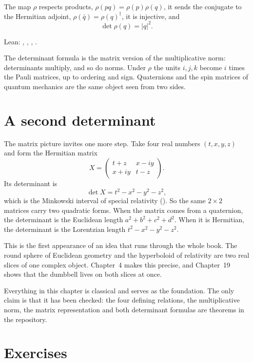 \begin{proposition}\proved\label{prop:rho}
The map $\rho$ respects products, $\rho(pq)=\rho(p)\rho(q)$, it sends the conjugate to the Hermitian adjoint, $\rho(\bar q)=\rho(q)^\dagger$, it is injective, and
\[
\det\rho(q)=|q|^2 .
\]
\end{proposition}
\noindent Lean: , , , .

The determinant formula is the matrix version of the multiplicative norm: determinants multiply, and so do norms. Under $\rho$ the units $i,j,k$ become $i$ times the Pauli matrices, up to ordering and sign. Quaternions and the spin matrices of quantum mechanics are the same object seen from two sides.

\section{A second determinant}

The matrix picture invites one more step. Take four real numbers $(t,x,y,z)$ and form the Hermitian matrix
\[
X=\begin{pmatrix} t+z & x-iy\\ x+iy & t-z\end{pmatrix}.
\]
Its determinant is
\[
\det X=t^2-x^2-y^2-z^2 ,
\]
which is the Minkowski interval of special relativity (). So the same $2\times2$ matrices carry two quadratic forms. When the matrix comes from a quaternion, the determinant is the Euclidean length $a^2+b^2+c^2+d^2$. When it is Hermitian, the determinant is the Lorentzian length $t^2-x^2-y^2-z^2$.

This is the first appearance of an idea that runs through the whole book. The round sphere of Euclidean geometry and the hyperboloid of relativity are two real slices of one complex object. Chapter~4 makes this precise, and Chapter~19 shows that the dumbbell lives on both slices at once.

\begin{standsbox}
Everything in this chapter is classical and serves as the foundation. The only claim is that it has been checked: the four defining relations, the multiplicative norm, the matrix representation and both determinant formulas are theorems in the repository.
\end{standsbox}

\section*{Exercises}

